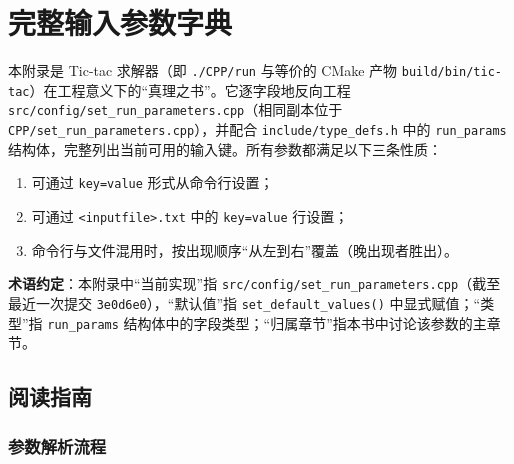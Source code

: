 
\chapter{完整输入参数字典}
\label{app:E_input_dictionary}

本附录是 Tic-tac 求解器（即 \texttt{./CPP/run} 与等价的 CMake 产物 \texttt{build/bin/tic-tac}）在工程意义下的“真理之书”。它逐字段地反向工程
\texttt{src/config/set\_run\_parameters.cpp}（相同副本位于 \texttt{CPP/set\_run\_parameters.cpp}），并配合 \texttt{include/type\_defs.h} 中的 \texttt{run\_params}
结构体，完整列出当前可用的输入键。所有参数都满足以下三条性质：
\begin{enumerate}
  \item 可通过 \texttt{key=value} 形式从命令行设置；
  \item 可通过 \texttt{<inputfile>.txt} 中的 \texttt{key=value} 行设置；
  \item 命令行与文件混用时，按出现顺序“从左到右”覆盖（晚出现者胜出）。
\end{enumerate}

\textbf{术语约定}：本附录中“当前实现”指 \texttt{src/config/set\_run\_parameters.cpp}（截至最近一次提交 \texttt{3e0d6e0}），“默认值”指 \texttt{set\_default\_values()}
中显式赋值；“类型”指 \texttt{run\_params} 结构体中的字段类型；“归属章节”指本书中讨论该参数的主章节。

\section{阅读指南}
\label{sec:appE_reading_guide}

\subsection{参数解析流程}

